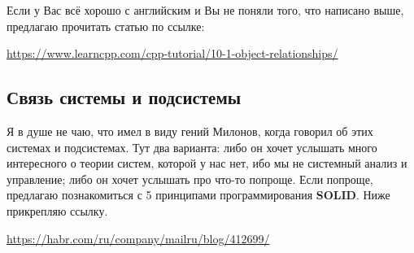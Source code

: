 \begin{notice}
    Если у Вас всё хорошо с английским и Вы не поняли того, что написано выше, предлагаю прочитать статью по ссылке:
    
    \url{https://www.learncpp.com/cpp-tutorial/10-1-object-relationships/}
\end{notice}

\subsection{Связь системы и подсистемы}
\begin{notice}
Я в душе не чаю, что имел в виду гений Милонов, когда говорил об этих системах и подсистемах. Тут два варианта: либо он хочет услышать много интересного о теории систем, которой у нас нет, ибо мы не системный анализ и управление; либо он хочет услышать про что-то попроще. Если попроще, предлагаю познакомиться с 5 принципами программирования \textbf{SOLID}. Ниже прикрепляю ссылку.
\end{notice}
\url{https://habr.com/ru/company/mailru/blog/412699/}

